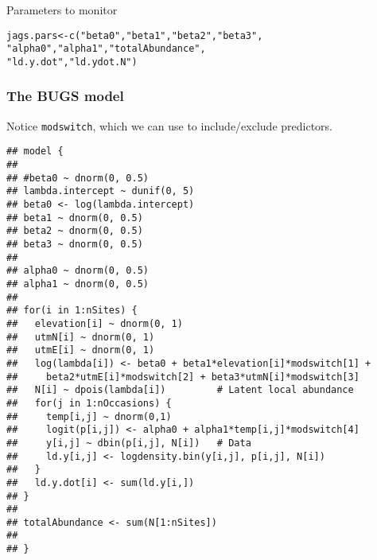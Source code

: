\documentclass[color=usenames,dvipsnames]{beamer}\usepackage[]{graphicx}\usepackage[]{color}
\makeatletter
\newcommand{\hlstr}[1]{\textcolor[rgb]{0.749,0.012,0.012}{#1}}%
\newcommand{\hlstd}[1]{\textcolor[rgb]{0,0,0}{#1}}%
\newcommand{\hlkwb}[1]{\textcolor[rgb]{0,0.341,0.682}{#1}}%
\newcommand{\hlkwd}[1]{\textcolor[rgb]{0.004,0.004,0.506}{#1}}%
\newenvironment{kframe}{%
 \def\at@end@of@kframe{}%
 \ifinner\ifhmode%
  \def\at@end@of@kframe{\end{minipage}}%
  \begin{minipage}{\columnwidth}%
 \fi\fi%
 \def\FrameCommand##1{\hskip\@totalleftmargin \hskip-\fboxsep
 \colorbox{shadecolor}{##1}\hskip-\fboxsep
     \hskip-\linewidth \hskip-\@totalleftmargin \hskip\columnwidth}%
 \MakeFramed {\advance\hsize-\width
   \@totalleftmargin\z@ \linewidth\hsize
   \@setminipage}}%
 {\par\unskip\endMakeFramed%
 \at@end@of@kframe}
\newenvironment{knitrout}{}{} %
\makeatother
\begin{document}
\begin{frame}[fragile]
  Parameters to monitor
  \vspace{-6pt}
\begin{knitrout}\scriptsize
{}\color{fgcolor}\begin{kframe}
\begin{alltt}
\hlstd{jags.pars} \hlkwb{<-} \hlkwd{c}\hlstd{(}\hlstr{"beta0"}\hlstd{,} \hlstr{"beta1"}\hlstd{,} \hlstr{"beta2"}\hlstd{,} \hlstr{"beta3"}\hlstd{,}
               \hlstr{"alpha0"}\hlstd{,} \hlstr{"alpha1"}\hlstd{,} \hlstr{"totalAbundance"}\hlstd{,}
               \hlstr{"ld.y.dot"}\hlstd{,} \hlstr{"ld.ydot.N"}\hlstd{)}
\end{alltt}
\end{kframe}
\end{knitrout}
\end{frame}





\begin{frame}[fragile]
  \frametitle{The BUGS model}
  \small
  Notice \alert{\tt modswitch}, which we can use to include/exclude
  predictors. 
  \tiny
\begin{knitrout}\tiny
{}\color{fgcolor}\begin{kframe}
\begin{verbatim}
## model {
## 
## #beta0 ~ dnorm(0, 0.5)  
## lambda.intercept ~ dunif(0, 5)
## beta0 <- log(lambda.intercept)
## beta1 ~ dnorm(0, 0.5)
## beta2 ~ dnorm(0, 0.5)
## beta3 ~ dnorm(0, 0.5)
## 
## alpha0 ~ dnorm(0, 0.5)  
## alpha1 ~ dnorm(0, 0.5)
## 
## for(i in 1:nSites) {
##   elevation[i] ~ dnorm(0, 1)
##   utmN[i] ~ dnorm(0, 1)
##   utmE[i] ~ dnorm(0, 1)
##   log(lambda[i]) <- beta0 + beta1*elevation[i]*modswitch[1] +
##     beta2*utmE[i]*modswitch[2] + beta3*utmN[i]*modswitch[3] 
##   N[i] ~ dpois(lambda[i])         # Latent local abundance
##   for(j in 1:nOccasions) {
##     temp[i,j] ~ dnorm(0,1)
##     logit(p[i,j]) <- alpha0 + alpha1*temp[i,j]*modswitch[4]
##     y[i,j] ~ dbin(p[i,j], N[i])   # Data
##     ld.y[i,j] <- logdensity.bin(y[i,j], p[i,j], N[i])
##   }
##   ld.y.dot[i] <- sum(ld.y[i,])
## }
## 
## totalAbundance <- sum(N[1:nSites])
## 
## }
\end{verbatim}
\end{kframe}
\end{knitrout}

\end{frame}
\end{document}
